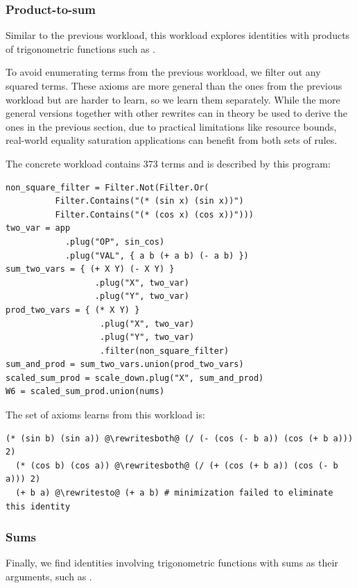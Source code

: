 \subsubsection{Product-to-sum}
Similar to the previous workload,
  this workload explores identities with
  products of trigonometric functions such as
  .

To avoid enumerating terms from the previous workload,
 we filter out any squared terms.
These axioms are more general than the ones from the
  previous workload but are harder to learn, so we learn them separately.
While the more general versions together with other rewrites
  can in theory be used to derive the ones in the previous section,
  due to practical limitations like resource bounds,
  real-world equality saturation applications can benefit from both sets of
  rules.

The concrete workload contains 373 terms and is described by this \enumo program:

\begin{lstlisting}
non_square_filter = Filter.Not(Filter.Or(
          Filter.Contains("(* (sin x) (sin x))")
          Filter.Contains("(* (cos x) (cos x))")))
two_var = app
            .plug("OP", sin_cos)
            .plug("VAL", { a b (+ a b) (- a b) })
sum_two_vars = { (+ X Y) (- X Y) }
                  .plug("X", two_var)
                  .plug("Y", two_var)
prod_two_vars = { (* X Y) }
                   .plug("X", two_var)
                   .plug("Y", two_var)
                   .filter(non_square_filter)
sum_and_prod = sum_two_vars.union(prod_two_vars)
scaled_sum_prod = scale_down.plug("X", sum_and_prod)
W6 = scaled_sum_prod.union(nums)
\end{lstlisting}

The set of axioms \enumo learns from this workload is:
\begin{lstlisting}[escapechar=@]
  (* (sin b) (sin a)) @\rewritesboth@ (/ (- (cos (- b a)) (cos (+ b a))) 2)
  (* (cos b) (cos a)) @\rewritesboth@ (/ (+ (cos (+ b a)) (cos (- b a))) 2)
  (+ b a) @\rewritesto@ (+ a b) # minimization failed to eliminate this identity
\end{lstlisting}

\subsubsection{Sums}
Finally, we find identities involving trigonometric
  functions with sums as their arguments, such as
  .

